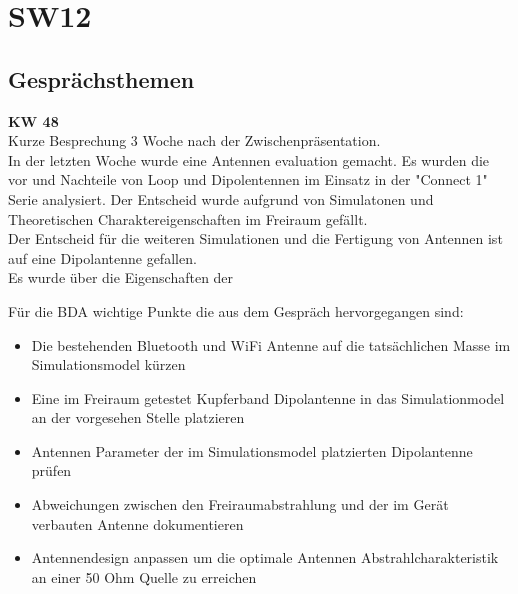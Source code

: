 \documentclass[10pt,a4paper]{article}
\begin{document}
\section*{SW12}

\subsection*{Gesprächsthemen}

\textbf{KW 48}\\
Kurze Besprechung 3 Woche nach der Zwischenpräsentation.\\


In der letzten Woche wurde eine Antennen evaluation gemacht. Es wurden die vor und Nachteile von Loop und Dipolentennen im Einsatz in der "Connect 1" Serie analysiert. Der Entscheid wurde aufgrund von Simulatonen und Theoretischen Charaktereigenschaften im Freiraum gefällt. \\
Der Entscheid für die weiteren Simulationen und die Fertigung von Antennen ist auf eine Dipolantenne gefallen.\\
Es wurde über die Eigenschaften der

\vspace{10 mm}
Für die BDA wichtige Punkte die aus dem Gespräch hervorgegangen sind:
\begin{itemize}
	\item Die bestehenden Bluetooth und WiFi Antenne auf die tatsächlichen Masse im Simulationsmodel kürzen
\item Eine im Freiraum getestet Kupferband Dipolantenne in das Simulationmodel an der vorgesehen Stelle platzieren
\item Antennen Parameter der im Simulationsmodel platzierten Dipolantenne prüfen
\item Abweichungen zwischen den Freiraumabstrahlung und der im Gerät verbauten Antenne dokumentieren
\item Antennendesign anpassen um die optimale Antennen Abstrahlcharakteristik an einer 50 Ohm Quelle zu erreichen
		
\end{itemize}
\end{document}
